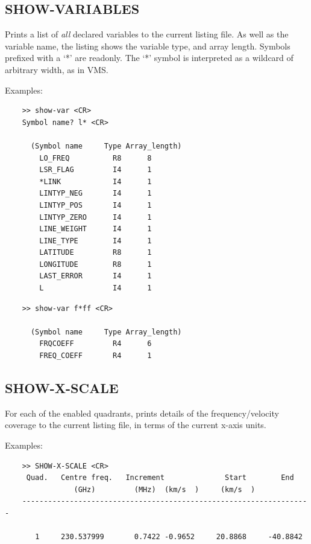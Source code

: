 \documentclass[11pt,twoside]{report}
\begin{document}
\subsection{SHOW-VARIABLES} 

Prints a list of {\em all} declared variables to the current listing file.
As well as the variable name, the listing shows the variable type, and array
length. Symbols prefixed with a `*' are readonly.
The `*' symbol is interpreted as a wildcard of arbitrary width, as in VMS.

Examples:
\begin{verbatim}
    >> show-var <CR>
    Symbol name? l* <CR>

      (Symbol name     Type Array_length)
        LO_FREQ          R8      8
        LSR_FLAG         I4      1
        *LINK            I4      1
        LINTYP_NEG       I4      1
        LINTYP_POS       I4      1
        LINTYP_ZERO      I4      1
        LINE_WEIGHT      I4      1
        LINE_TYPE        I4      1
        LATITUDE         R8      1
        LONGITUDE        R8      1
        LAST_ERROR       I4      1
        L                I4      1
\end{verbatim}

\begin{verbatim}
    >> show-var f*ff <CR>

      (Symbol name     Type Array_length)
        FRQCOEFF         R4      6
        FREQ_COEFF       R4      1
\end{verbatim}

\subsection{SHOW-X-SCALE} 

For each of the enabled quadrants, prints details of the frequency/velocity
\etc coverage to the current listing file, in terms of the current x-axis
units.

Examples:
\begin{verbatim}
    >> SHOW-X-SCALE <CR>
     Quad.   Centre freq.   Increment              Start        End
                (GHz)         (MHz)  (km/s  )     (km/s  )
    -------------------------------------------------------------------

       1     230.537999       0.7422 -0.9652     20.8868     -40.8842

\end{verbatim}
\end{document}
